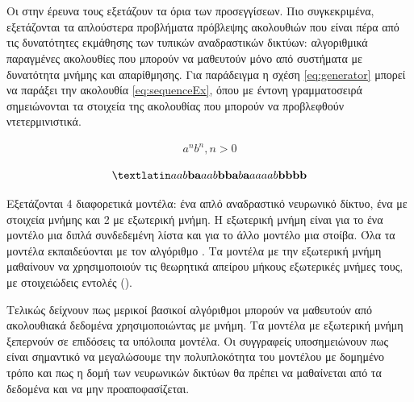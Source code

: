 \section{}

Οι  \cite{Joulin2015} στην έρευνα τους εξετάζουν τα όρια των  προσεγγίσεων.
Πιο συγκεκριμένα, εξετάζονται τα απλούστερα προβλήματα πρόβλεψης ακολουθιών που είναι πέρα από τις δυνατότητες εκμάθησης των τυπικών αναδραστικών δικτύων: αλγοριθμικά παραγμένες ακολουθίες που μπορούν να μαθευτούν μόνο από συστήματα με δυνατότητα μνήμης και απαρίθμησης.
Για παράδειγμα η σχέση \ref{eq:generator} μπορεί να παράξει την ακολουθία \ref{eq:sequenceEx}, όπου με έντονη γραμματοσειρά σημειώνονται τα στοιχεία της ακολουθίας που μπορούν να προβλεφθούν ντετερμινιστικά.

\begin{ceqn}
\begin{align}
a^nb^n, n > 0\label{eq:generator}
\end{align}
\end{ceqn}

\begin{ceqn}
\begin{align}
\tl{aab\textbf{ba}aab\textbf{bba}b\textbf{a}aaaab\textbf{bbbb}}\label{eq:sequenceEx}
\end{align}
\end{ceqn}

Εξετάζονται 4 διαφορετικά μοντέλα: ένα απλό αναδραστικό νευρωνικό δίκτυο, ένα  με στοιχεία μνήμης  και 2  με εξωτερική μνήμη.
Η εξωτερική μνήμη είναι για το ένα μοντέλο μια διπλά συνδεδεμένη λίστα και για το άλλο μοντέλο μια στοίβα. Όλα τα μοντέλα εκπαιδεύονται με τον αλγόριθμο .
Τα μοντέλα με την εξωτερική μνήμη μαθαίνουν να χρησιμοποιούν τις θεωρητικά απείρου μήκους εξωτερικές μνήμες τους, με στοιχειώδεις εντολές (). 

Τελικώς δείχνουν πως μερικοί βασικοί αλγόριθμοι μπορούν να μαθευτούν από ακολουθιακά δεδομένα χρησιμοποιώντας  με μνήμη. Τα μοντέλα με εξωτερική μνήμη ξεπερνούν σε επιδόσεις τα υπόλοιπα μοντέλα. Οι συγγραφείς υποσημειώνουν πως είναι σημαντικό να μεγαλώσουμε την πολυπλοκότητα του μοντέλου με δομημένο τρόπο και πως η δομή των νευρωνικών δικτύων θα πρέπει να μαθαίνεται από τα δεδομένα και να μην προαποφασίζεται.

\section{}

